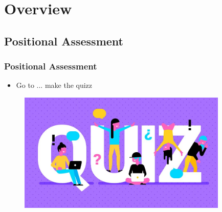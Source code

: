 

\newlength\myheight
\newlength\mydepth
\settototalheight{}
\settodepth{}
\setlength\fboxsep{0pt}
\newcommand*\inlinegraphics[1]{%
  \settototalheight\myheight{Xygp}%
  \settodepth\mydepth{Xygp}%
  \raisebox{-\mydepth}{\texttt{[image: \#1]}}%
}




\begin{frame}
   \titlepage
\end{frame}



\begin{frame}
   \tableofcontents
\end{frame}

\section{Overview}


\subsection{Positional Assessment}
\begin{frame}\frametitle{Positional Assessment}
   \begin{itemize}
      \item Go to ... make the quizz
   \end{itemize}

   \begin{figure}[H]
      \includegraphics[width=10cm]{../images/illustrations/quiz.jpeg}
   \end{figure}
\end{frame} 



